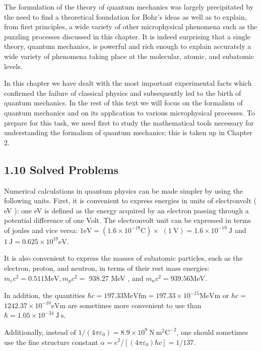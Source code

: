 \documentclass[10pt]{article}
\begin{document}
The formulation of the theory of quantum mechanics was largely precipitated by the need to find a theoretical foundation for Bohr's ideas as well as to explain, from first principles, a wide variety of other microphysical phenomena such as the puzzling processes discussed in this chapter. It is indeed surprising that a single theory, quantum mechanics, is powerful and rich enough to explain accurately a wide variety of phenomena taking place at the molecular, atomic, and subatomic levels.

In this chapter we have dealt with the most important experimental facts which confirmed the failure of classical physics and subsequently led to the birth of quantum mechanics. In the rest of this text we will focus on the formalism of quantum mechanics and on its application to various microphysical processes. To prepare for this task, we need first to study the mathematical tools necessary for understanding the formalism of quantum mechanics; this is taken up in Chapter 2.

\subsection*{1.10 Solved Problems}
Numerical calculations in quantum physics can be made simpler by using the following units. First, it is convenient to express energies in units of electronvolt ( eV ): one eV is defined as the energy acquired by an electron passing through a potential difference of one Volt. The electronvolt unit can be expressed in terms of joules and vice versa: $1 \mathrm{eV}=\left(1.6 \times 10^{-19} \mathrm{C}\right) \times$ $(1 \mathrm{~V})=1.6 \times 10^{-19} \mathrm{~J}$ and $1 \mathrm{~J}=0.625 \times 10^{19} \mathrm{eV}$.

It is also convenient to express the masses of subatomic particles, such as the electron, proton, and neutron, in terms of their rest mass energies: $m_{e} c^{2}=0.511 \mathrm{MeV}, m_{p} c^{2}=$ 938.27 MeV , and $m_{n} c^{2}=939.56 \mathrm{MeV}$.

In addition, the quantities $\hbar c=197.33 \mathrm{MeV} \mathrm{fm}=197.33 \times 10^{-15} \mathrm{MeV} \mathrm{m}$ or $h c=$ $1242.37 \times 10^{-10} \mathrm{eV} \mathrm{m}$ are sometimes more convenient to use than $\hbar=1.05 \times 10^{-34} \mathrm{~J} \mathrm{~s}$.

Additionally, instead of $1 /\left(4 \pi \varepsilon_{0}\right)=8.9 \times 10^{9} \mathrm{~N} \mathrm{~m}^{2} \mathrm{C}^{-2}$, one should sometimes use the fine structure constant $\alpha=e^{2} /\left[\left(4 \pi \varepsilon_{0}\right) \hbar c\right]=1 / 137$.
\end{document}
